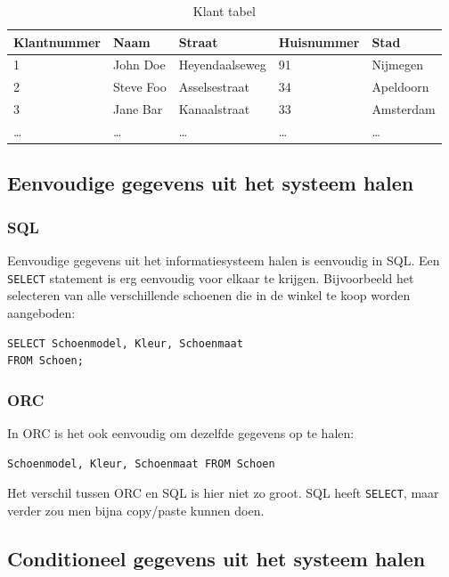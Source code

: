 \documentclass[11pt]{article}
\begin{document}
\begin{table}[hp]
  \centering
  \begin{tabular}{l|l|l|l|l}
    \textbf{Klantnummer} & \textbf{Naam} & \textbf{Straat} & \textbf{Huisnummer} & \textbf{Stad} \\
    \hline
    1 & John Doe & Heyendaalseweg & 91 & Nijmegen \\
    2 & Steve Foo & Asselsestraat & 34 & Apeldoorn \\
    3 & Jane Bar  & Kanaalstraat  & 33 & Amsterdam \\
    \dots & \dots & \dots& \dots& \dots \\
  \end{tabular}
  \caption{Klant tabel}
  \label{tab:klant}
\end{table}

\FloatBarrier
\subsection{Eenvoudige gegevens uit het systeem halen}

\subsubsection{SQL}

Eenvoudige gegevens uit het informatiesysteem halen is eenvoudig in SQL. Een
\verb+SELECT+ statement is erg eenvoudig voor elkaar te krijgen. Bijvoorbeeld
het selecteren van alle verschillende schoenen die in de winkel te koop worden
aangeboden:

\begin{verbatim}
SELECT Schoenmodel, Kleur, Schoenmaat 
FROM Schoen;
\end{verbatim}

\subsubsection{ORC}

In ORC is het ook eenvoudig om dezelfde gegevens op te halen:

\begin{verbatim}
Schoenmodel, Kleur, Schoenmaat FROM Schoen
\end{verbatim}

Het verschil tussen ORC en SQL is hier niet zo groot. SQL heeft \verb+SELECT+,
maar verder zou men bijna copy/paste kunnen doen.

\subsection{Conditioneel gegevens uit het systeem halen}
\end{document}
